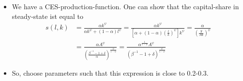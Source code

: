 \documentclass{article}
\begin{document}
\begin{itemize}
  \item We have a CES-production-function. One can show that the capital-share in steady-state ist equal to
  \begin{align*}
    s(l,k) &= \frac{\alpha k^\psi}{\alpha k^\psi + (1-\alpha) l^\psi}= \frac{\alpha k^\psi}{\left[\alpha + (1-\alpha) \left(\frac{l}{k}\right)^\psi\right] k^\psi}=\frac{\alpha}{\left(\frac{y}{Ak}\right)^\psi}\\
    &= \frac{\alpha A^\psi}{\left(\frac{\beta^{-1}-1+\delta}{\alpha}\right)^{\frac{\psi}{1-\psi}}} = \frac{\alpha^{\frac{1}{1-\psi}} A^\psi}{\left(\beta^{-1}-1+\delta\right)^\frac{\psi}{1-\psi}}
  \end{align*}
  \item So, choose parameters such that this expression is close to 0.2-0.3.
\end{itemize}
\end{document}
